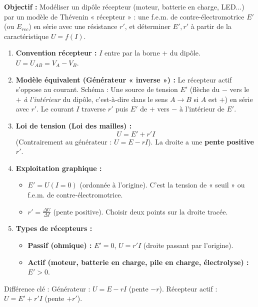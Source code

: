 \documentclass[11pt]{article}
\newcommand{\cle}[1]{{\popxbold\color{popdark}#1}}
\begin{document}
\begin{methode}[Schématiser un récepteur actif et exploiter sa caractéristique $U=f(I)$]
\textbf{Objectif :} Modéliser un dipôle récepteur (moteur, batterie en charge, LED...) par un modèle de Thévenin « récepteur » : une f.e.m. de contre-électromotrice $E'$ (ou $E_{rec}$) en série avec une résistance $r'$, et déterminer $E', r'$ à partir de la caractéristique $U=f(I)$.
\begin{enumerate}
    \item \textbf{Convention récepteur :} $I$ entre par la borne $+$ du dipôle. $U = U_{AB} = V_A - V_B$.
    \item \textbf{Modèle équivalent (Générateur « inverse ») :} Le récepteur actif s'oppose au courant. Schéma : Une source de tension $E'$ (flèche du $-$ vers le $+$ \emph{à l'intérieur} du dipôle, c'est-à-dire dans le sens $A \to B$ si $A$ est $+$) en série avec $r'$. Le courant $I$ traverse $r'$ puis $E'$ de $+$ vers $-$ à l'intérieur de $E'$.
    \item \textbf{Loi de tension (Loi des mailles) :}
    \[ U = E' + r' I \]
    (Contrairement au générateur : $U = E - rI$). La droite a une \textbf{pente positive} $r'$.
    \item \textbf{Exploitation graphique :}
        \begin{itemize}
            \item $E' = U(I=0)$ (ordonnée à l'origine). C'est la tension de « seuil » ou f.e.m. de contre-électromotrice.
            \item $r' = \frac{\Delta U}{\Delta I}$ (pente positive). Choisir deux points sur la droite tracée.
        \end{itemize}
    \item \textbf{Types de récepteurs :}
        \begin{itemize}
            \item \textbf{Passif (ohmique) :} $E'=0$, $U=r'I$ (droite passant par l'origine).
            \item \textbf{Actif (moteur, batterie en charge, pile en charge, électrolyse) :} $E' > 0$.
        \end{itemize}
\end{enumerate}
\cle{Différence clé} : Générateur : $U = E - rI$ (pente $-r$). Récepteur actif : $U = E' + r'I$ (pente $+r'$).
\end{methode}
\end{document}
